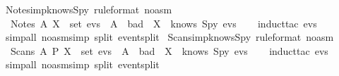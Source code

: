 \begin{isabellebody}
  {\isafoldproof}%
  \isadelimproof
  \isanewline
  \endisadelimproof
  \isanewline
  \isamarkupfalse%
  \ Notes{\isacharunderscore}imp{\isacharunderscore}knows{\isacharunderscore}Spy\ {\isacharbrackleft}rule{\isacharunderscore}format\ {\isacharparenleft}no{\isacharunderscore}asm{\isacharparenright}{\isacharbrackright}\ {\isacharcolon}\isanewline
  \ \ {\isachardoublequoteopen}Notes\ A\ X\ {\isasymin}\ set\ evs\ {\isasymlongrightarrow}\ A\ {\isasymin}\ bad\ {\isasymlongrightarrow}\ X\ {\isasymin}\ knows\ Spy\ evs{\isachardoublequoteclose}\isanewline
  \isadelimproof
  \isanewline
  \ \ %
  \endisadelimproof
  \isatagproof
  \isamarkupfalse%
  \ {\isacharparenleft}induct{\isacharunderscore}tac\ {\isachardoublequoteopen}evs{\isachardoublequoteclose}{\isacharparenright}\isanewline
  \ \ \isamarkupfalse%
  \ {\isacharparenleft}simp{\isacharunderscore}all\ {\isacharparenleft}no{\isacharunderscore}asm{\isacharunderscore}simp{\isacharparenright}\ split{\isacharcolon}\ event{\isachardot}split{\isacharparenright}\isanewline
  \isamarkupfalse%
  \isanewline
  \isanewline
  \endisatagproof
  {\isafoldproof}%
  \isadelimproof
  \isanewline
  \endisadelimproof
  \isanewline
  \isamarkupfalse%
  \ Scans{\isacharunderscore}imp{\isacharunderscore}knows{\isacharunderscore}Spy\ {\isacharbrackleft}rule{\isacharunderscore}format\ {\isacharparenleft}no{\isacharunderscore}asm{\isacharparenright}{\isacharbrackright}\ {\isacharcolon}\isanewline
  \ \ {\isachardoublequoteopen}Scans\ A\ P\ X\ {\isasymin}\ set\ evs\ {\isasymlongrightarrow}\ A\ {\isasymin}\ bad\ {\isasymlongrightarrow}\ X\ {\isasymin}\ knows\ Spy\ evs{\isachardoublequoteclose}\isanewline
  \isadelimproof
  \isanewline
  \ \ %
  \endisadelimproof
  \isatagproof
  \isamarkupfalse%
  \ {\isacharparenleft}induct{\isacharunderscore}tac\ {\isachardoublequoteopen}evs{\isachardoublequoteclose}{\isacharparenright}\isanewline
  \ \ \isamarkupfalse%
  \ {\isacharparenleft}simp{\isacharunderscore}all\ {\isacharparenleft}no{\isacharunderscore}asm{\isacharunderscore}simp{\isacharparenright}\ split{\isacharcolon}\ event{\isachardot}split{\isacharparenright}\isanewline
  \isamarkupfalse%
  \isanewline
  \isanewline
  \endisatagproof
  {\isafoldproof}%
  \isadelimproof
  \isanewline
  \endisadelimproof

\end{isabellebody}
